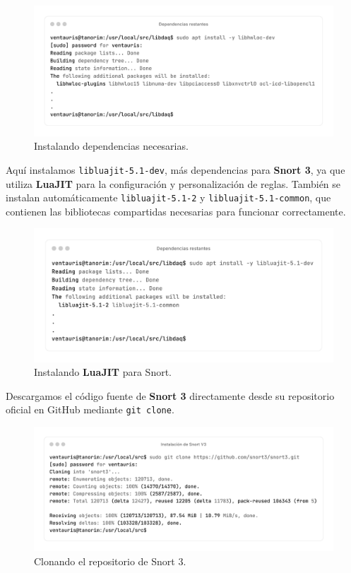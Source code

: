 \documentclass[11pt,a4paper,twoside]{report}
\begin{document}
\begin{figure}[H]
	\centering
	\includegraphics[scale=0.12]{instalacion_snort/15-15.png}
	\caption{Instalando dependencias necesarias.}
\end{figure}

Aquí instalamos \texttt{libluajit-5.1-dev}, más dependencias para \textbf{Snort 3}, ya que utiliza \textbf{LuaJIT} para la configuración y personalización de reglas. También se instalan automáticamente \texttt{libluajit-5.1-2} y \texttt{libluajit-5.1-common}, que contienen las bibliotecas compartidas necesarias para funcionar correctamente.

\begin{figure}[H]
	\centering
	\includegraphics[scale=0.12]{instalacion_snort/16-16.png}
	\caption{Instalando \textbf{LuaJIT} para Snort.}
\end{figure}

\newpage

Descargamos el código fuente de \textbf{Snort 3} directamente desde su repositorio oficial en GitHub mediante \texttt{git clone}.

\begin{figure}[H]
	\centering
	\includegraphics[scale=0.12]{instalacion_snort/17-17.png}
	\caption{Clonando el repositorio de Snort 3.}
\end{figure}
\end{document}
